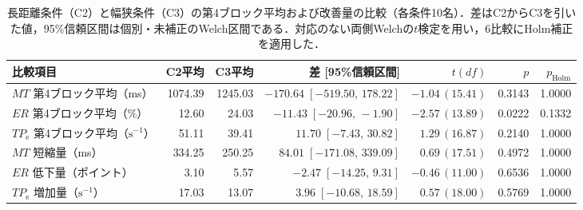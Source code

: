 \begin{table}[htbp]
  \centering
  \caption{長距離条件（C2）と幅狭条件（C3）の第4ブロック平均および改善量の比較（各条件10名）．差はC2からC3を引いた値，95\%信頼区間は個別・未補正のWelch区間である．対応のない両側Welchの\(t\)検定を用い，6比較にHolm補正を適用した．}
  \label{tab:practice-c2-c3-between}
  \small
  \setlength{\tabcolsep}{3pt}
  \begin{tabular}{lrrrrrr}
    \hline
    比較項目 & C2平均 & C3平均 & 差 [95\%信頼区間] & \(t(df)\) & \(p\) & \(p_{\mathrm{Holm}}\) \\
    \hline
    \(MT\) 第4ブロック平均（ms） & 1074.39 & 1245.03 & \(-170.64\;[-519.50,\,178.22]\) & \(-1.04\,(15.41)\) & 0.3143 & 1.0000 \\
    \(ER\) 第4ブロック平均（\%） & 12.60 & 24.03 & \(-11.43\;[-20.96,\,-1.90]\) & \(-2.57\,(13.89)\) & 0.0222 & 0.1332 \\
    \(TP_{\mathrm{e}}\) 第4ブロック平均（\(\mathrm{s}^{-1}\)） & 51.11 & 39.41 & \(11.70\;[-7.43,\,30.82]\) & \(1.29\,(16.87)\) & 0.2140 & 1.0000 \\
    \hline
    \(MT\) 短縮量（ms） & 334.25 & 250.25 & \(84.01\;[-171.08,\,339.09]\) & \(0.69\,(17.51)\) & 0.4972 & 1.0000 \\
    \(ER\) 低下量（ポイント） & 3.10 & 5.57 & \(-2.47\;[-14.25,\,9.31]\) & \(-0.46\,(11.00)\) & 0.6536 & 1.0000 \\
    \(TP_{\mathrm{e}}\) 増加量（\(\mathrm{s}^{-1}\)） & 17.03 & 13.07 & \(3.96\;[-10.68,\,18.59]\) & \(0.57\,(18.00)\) & 0.5769 & 1.0000 \\
    \hline
  \end{tabular}
\end{table}
